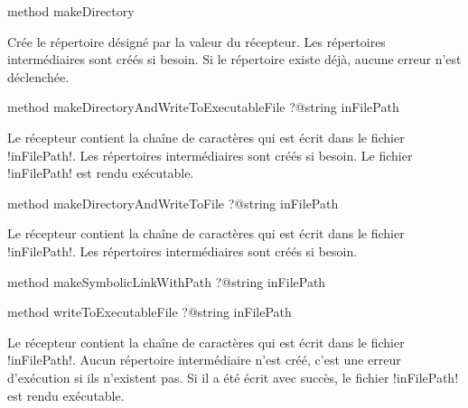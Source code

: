 
\begin{galgasbox}
method makeDirectory
\end{galgasbox}

Crée le répertoire désigné par la valeur du récepteur. Les répertoires intermédiaires sont créés si besoin. Si le répertoire existe déjà, aucune erreur n'est déclenchée.







\begin{galgasbox}
method makeDirectoryAndWriteToExecutableFile ?@string inFilePath
\end{galgasbox}

Le récepteur contient la chaîne de caractères qui est écrit dans le fichier \ggs!inFilePath!. Les répertoires intermédiaires sont créés si besoin. Le fichier \ggs!inFilePath! est rendu exécutable.








\begin{galgasbox}
method makeDirectoryAndWriteToFile ?@string inFilePath
\end{galgasbox}

Le récepteur contient la chaîne de caractères qui est écrit dans le fichier \ggs!inFilePath!. Les répertoires intermédiaires sont créés si besoin.









\begin{galgasbox}
method makeSymbolicLinkWithPath ?@string inFilePath
\end{galgasbox}









\begin{galgasbox}
method writeToExecutableFile ?@string inFilePath
\end{galgasbox}

Le récepteur contient la chaîne de caractères qui est écrit dans le fichier \ggs!inFilePath!. Aucun répertoire intermédiaire n'est créé, c'est une erreur d'exécution si ils n'existent pas. Si il a été écrit avec succès, le fichier \ggs!inFilePath! est rendu exécutable.









